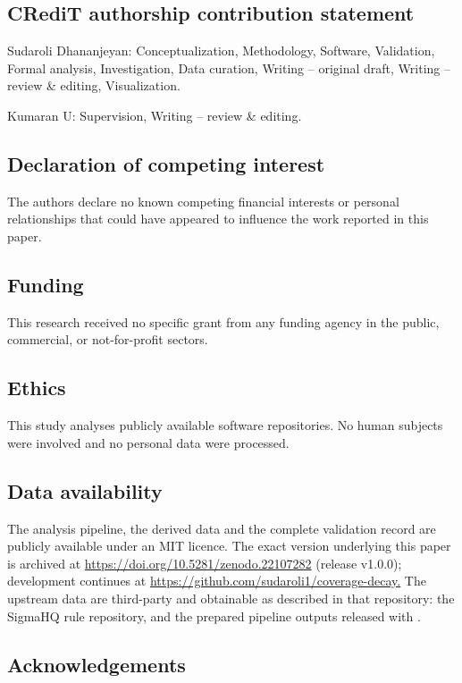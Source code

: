 \subsection{CRediT authorship contribution statement}

Sudaroli Dhananjeyan: Conceptualization, Methodology, Software, Validation, Formal analysis, Investigation, Data curation, Writing -- original draft, Writing -- review \& editing, Visualization.

Kumaran U: Supervision, Writing -- review \& editing.

\subsection{Declaration of competing interest}

The authors declare no known competing financial interests or personal relationships that could have appeared to influence the work reported in this paper.

\subsection{Funding}

This research received no specific grant from any funding agency in the public, commercial, or not-for-profit sectors.

\subsection{Ethics}

This study analyses publicly available software repositories. No human subjects were involved and no personal data were processed.

\subsection{Data availability}

The analysis pipeline, the derived data and the complete validation record are publicly available under an MIT licence. The exact version underlying this paper is archived at \url{https://doi.org/10.5281/zenodo.22107282} (release v1.0.0); development continues at \url{https://github.com/sudaroli1/coverage-decay.} The upstream data are third-party and obtainable as described in that repository: the SigmaHQ rule repository, and the prepared pipeline outputs released with \citet{long2026}.

\subsection{Acknowledgements}

